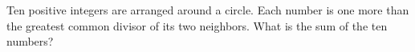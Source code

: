 Ten positive integers are arranged around a circle. Each number is one more than the greatest common divisor of its two neighbors. What is the sum of the ten numbers?